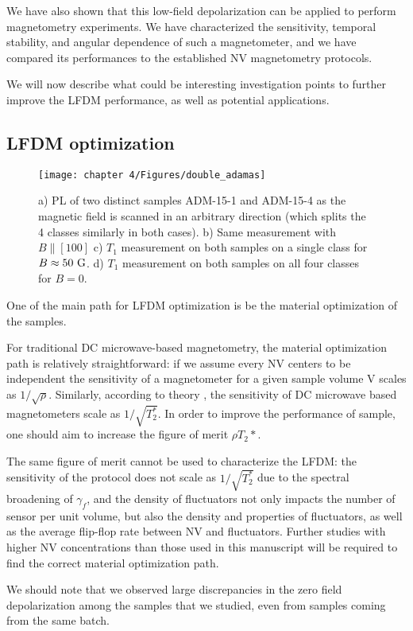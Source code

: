 \documentclass[a4paper, 11pt]{report}
\begin{document}
We have also shown that this low-field depolarization can be applied to perform magnetometry experiments. We have characterized the sensitivity, temporal stability, and angular dependence of such a magnetometer, and we have compared its performances to the established NV magnetometry protocols.

We will now describe what could be interesting investigation points to further improve the LFDM performance, as well as potential applications.

\subsection{LFDM optimization}
\begin{figure}[h!]
\centering
\texttt{[image: chapter 4/Figures/double\_adamas]}
\caption{a) PL of two distinct samples ADM-15-1 and ADM-15-4 as the magnetic field is scanned in an arbitrary direction (which splits the 4 classes similarly in both cases). b) Same measurement with $B\parallel [100]$ c) $T_1$ measurement on both samples on a single class for $B\approx 50\ \rm G$. d) $T_1$ measurement on both samples on all four classes for $B=0$.}
\label{double dragon}
\end{figure}

One of the main path for LFDM optimization is be the material optimization of the samples.

For traditional DC microwave-based magnetometry, the material optimization path is relatively straightforward: if we assume every NV centers to be independent the sensitivity of a magnetometer for a given sample volume V scales as $1/\sqrt{\rho}$. Similarly, according to theory \citep{barry2020sensitivity}, the sensitivity of DC microwave based magnetometers scale as $1/\sqrt{T_2^*}$. In order to improve the performance of sample, one should aim to increase the figure of merit $\rho T_2*$.

The same figure of merit cannot be used to characterize the LFDM: the sensitivity of the protocol does not scale as $1/\sqrt{T_2^*}$ due to the spectral broadening of $\gamma_f$, and the density of fluctuators not only impacts the number of sensor per unit volume, but also the density and properties of fluctuators, as well as the average flip-flop rate between NV and fluctuators. Further studies with higher NV concentrations than those used in this manuscript will be required to find the correct material optimization path.

We should note that we observed large discrepancies in the zero field depolarization among the samples that we studied, even from samples coming from the same batch.
\end{document}
